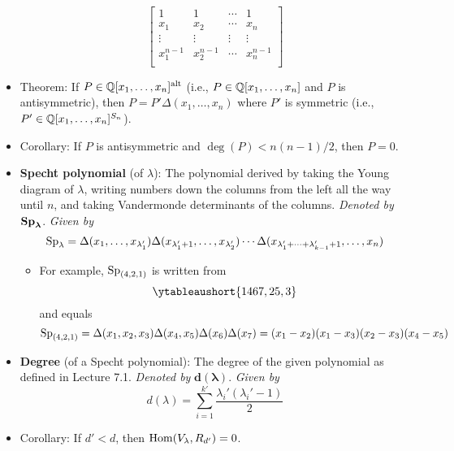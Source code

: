 \documentclass[../notes.tex]{subfiles}
\begin{document}
\begin{itemize}
\begin{equation*}
\begin{bmatrix}
            1 & 1 & \cdots & 1\\
            x_1 & x_2 & \cdots & x_n\\
            \vdots & \vdots & \vdots & \vdots\\
            x_1^{n-1} & x_2^{n-1} & \cdots & x_n^{n-1}\\
        \end{bmatrix}
    \end{equation*}
    \item Theorem: If $P\in\mathbb{Q}[x_1,\dots,x_n]^\text{alt}$ (i.e., $P\in\mathbb{Q}[x_1,\dots,x_n]$ and $P$ is antisymmetric), then $P=P'\Delta(x_1,\dots,x_n)$ where $P'$ is symmetric (i.e., $P'\in\mathbb{Q}[x_1,\dots,x_n]^{S_n}$).
    \item Corollary: If $P$ is antisymmetric and $\deg(P)<n(n-1)/2$, then $P=0$.
    \item \textbf{Specht polynomial} (of $\lambda$): The polynomial derived by taking the Young diagram of $\lambda$, writing numbers down the columns from the left all the way until $n$, and taking Vandermonde determinants of the columns. \emph{Denoted by} $\bm{\Sp_\lambda}$. \emph{Given by}
    \begin{equation*}
        \operatorname{Sp}_\lambda = \Delta(x_1,\dots,x_{\lambda_1'})\Delta(x_{\lambda_1'+1},\dots,x_{\lambda_2'})\cdots\Delta(x_{\lambda_1'+\cdots+\lambda_{k-1}'+1},\dots,x_n)
    \end{equation*}
    \begin{itemize}
        \item For example, $\operatorname{Sp}_{(4,2,1)}$ is written from
        \begin{equation*}
            \ytableaushort{1467,25,3}
        \end{equation*}
        and equals
        \begin{equation*}
            \operatorname{Sp}_{(4,2,1)} = \Delta(x_1,x_2,x_3)\Delta(x_4,x_5)\Delta(x_6)\Delta(x_7)
            = (x_1-x_2)(x_1-x_3)(x_2-x_3)(x_4-x_5)
        \end{equation*}
    \end{itemize}
    \item \textbf{Degree} (of a Specht polynomial): The degree of the given polynomial as defined in Lecture 7.1. \emph{Denoted by} $\bm{d(\lambda)}$. \emph{Given by}
    \begin{equation*}
        d(\lambda) = \sum_{i=1}^{k'}\frac{\lambda_i'(\lambda_i'-1)}{2}
    \end{equation*}
    \item Corollary: If $d'<d$, then $\operatorname{Hom}(V_\lambda,R_{d'})=0$.

\end{itemize}
\end{document}
